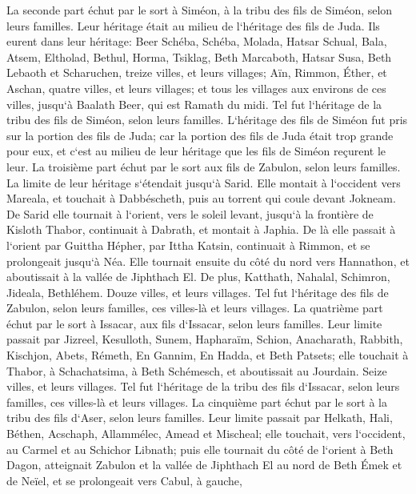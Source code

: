 \verse La seconde part échut par le sort à Siméon, à la tribu des fils de Siméon, selon leurs familles. Leur héritage était au milieu de l`héritage des fils de Juda. 
\verse Ils eurent dans leur héritage: Beer Schéba, Schéba, Molada, 
\verse Hatsar Schual, Bala, Atsem, 
\verse Eltholad, Bethul, Horma, 
\verse Tsiklag, Beth Marcaboth, Hatsar Susa, 
\verse Beth Lebaoth et Scharuchen, treize villes, et leurs villages; 
\verse Aïn, Rimmon, Éther, et Aschan, quatre villes, et leurs villages; 
\verse et tous les villages aux environs de ces villes, jusqu`à Baalath Beer, qui est Ramath du midi. Tel fut l`héritage de la tribu des fils de Siméon, selon leurs familles. 
\verse L`héritage des fils de Siméon fut pris sur la portion des fils de Juda; car la portion des fils de Juda était trop grande pour eux, et c`est au milieu de leur héritage que les fils de Siméon reçurent le leur. 
\verse La troisième part échut par le sort aux fils de Zabulon, selon leurs familles. 
\verse La limite de leur héritage s`étendait jusqu`à Sarid. Elle montait à l`occident vers Mareala, et touchait à Dabbéscheth, puis au torrent qui coule devant Jokneam. 
\verse De Sarid elle tournait à l`orient, vers le soleil levant, jusqu`à la frontière de Kisloth Thabor, continuait à Dabrath, et montait à Japhia. 
\verse De là elle passait à l`orient par Guittha Hépher, par Ittha Katsin, continuait à Rimmon, et se prolongeait jusqu`à Néa. 
\verse Elle tournait ensuite du côté du nord vers Hannathon, et aboutissait à la vallée de Jiphthach El. 
\verse De plus, Katthath, Nahalal, Schimron, Jideala, Bethléhem. Douze villes, et leurs villages. 
\verse Tel fut l`héritage des fils de Zabulon, selon leurs familles, ces villes-là et leurs villages. 
\verse La quatrième part échut par le sort à Issacar, aux fils d`Issacar, selon leurs familles. 
\verse Leur limite passait par Jizreel, Kesulloth, Sunem, 
\verse Hapharaïm, Schion, Anacharath, 
\verse Rabbith, Kischjon, Abets, 
\verse Rémeth, En Gannim, En Hadda, et Beth Patsets; 
\verse elle touchait à Thabor, à Schachatsima, à Beth Schémesch, et aboutissait au Jourdain. Seize villes, et leurs villages. 
\verse Tel fut l`héritage de la tribu des fils d`Issacar, selon leurs familles, ces villes-là et leurs villages. 
\verse La cinquième part échut par le sort à la tribu des fils d`Aser, selon leurs familles. 
\verse Leur limite passait par Helkath, Hali, Béthen, Acschaph, 
\verse Allammélec, Amead et Mischeal; elle touchait, vers l`occident, au Carmel et au Schichor Libnath; 
\verse puis elle tournait du côté de l`orient à Beth Dagon, atteignait Zabulon et la vallée de Jiphthach El au nord de Beth Émek et de Neïel, et se prolongeait vers Cabul, à gauche, 

